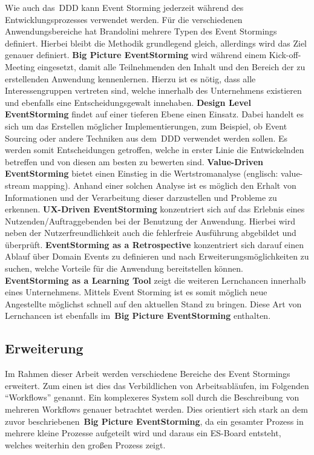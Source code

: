 Wie auch das~\ac{DDD} kann Event Storming jederzeit während des Entwicklungsprozesses verwendet werden.
Für die verschiedenen Anwendungsbereiche hat Brandolini mehrere Typen des Event Stormings definiert\cite*{introES}.
Hierbei bleibt die Methodik grundlegend gleich, allerdings wird das Ziel genauer definiert.\newline
\textbf{Big Picture EventStorming} wird während einem Kick-off-Meeting eingesetzt, damit alle Teilnehmenden den Inhalt und den Bereich der zu erstellenden Anwendung kennenlernen.
Hierzu ist es nötig, dass alle Interessengruppen vertreten sind, welche innerhalb des Unternehmens existieren und ebenfalls eine Entscheidungsgewalt innehaben.\newline
\textbf{Design Level EventStorming} findet auf einer tieferen Ebene einen Einsatz.
Dabei handelt es sich um das Erstellen möglicher Implementierungen, zum Beispiel, ob Event Sourcing oder andere Techniken aus dem~\ac{DDD} verwendet werden sollen.
Es werden somit Entscheidungen getroffen, welche in erster Linie die Entwickelnden betreffen und von diesen am besten zu bewerten sind.\newline
\textbf{Value-Driven EventStorming} bietet einen Einstieg in die Wertstromanalyse (englisch: value-stream mapping).
Anhand einer solchen Analyse ist es möglich den Erhalt von Informationen und der Verarbeitung dieser darzustellen und Probleme zu erkennen.\newline
\textbf{UX-Driven EventStorming} konzentriert sich auf das Erlebnis eines Nutzenden/Auftraggebenden bei der Benutzung der Anwendung.
Hierbei wird neben der Nutzerfreundlichkeit auch die fehlerfreie Ausführung abgebildet und überprüft.\newline
\textbf{EventStorming as a Retrospective} konzentriert sich darauf einen Ablauf über Domain Events zu definieren und nach
Erweiterungsmöglichkeiten zu suchen, welche Vorteile für die Anwendung bereitstellen können.\newline
\textbf{EventStorming as a Learning Tool} zeigt die weiteren Lernchancen innerhalb eines Unternehmens.
Mittels Event Storming ist es somit möglich neue Angestellte möglichst schnell auf den aktuellen Stand zu bringen.
Diese Art von Lernchancen ist ebenfalls im~\textbf{Big Picture EventStorming} enthalten.

\subsection{Erweiterung}\label{subsec:erweiterung}
Im Rahmen dieser Arbeit werden verschiedene Bereiche des Event Stormings erweitert.
Zum einen ist dies das Verbildlichen von Arbeitsabläufen, im Folgenden ``Workflows'' genannt.
Ein komplexeres System soll durch die Beschreibung von mehreren Workflows genauer betrachtet werden.
Dies orientiert sich stark an dem zuvor beschriebenen~\textbf{Big Picture EventStorming}, da ein gesamter Prozess in mehrere kleine
Prozesse aufgeteilt wird und daraus ein \ac{ES}-Board entsteht, welches weiterhin den großen Prozess zeigt.

